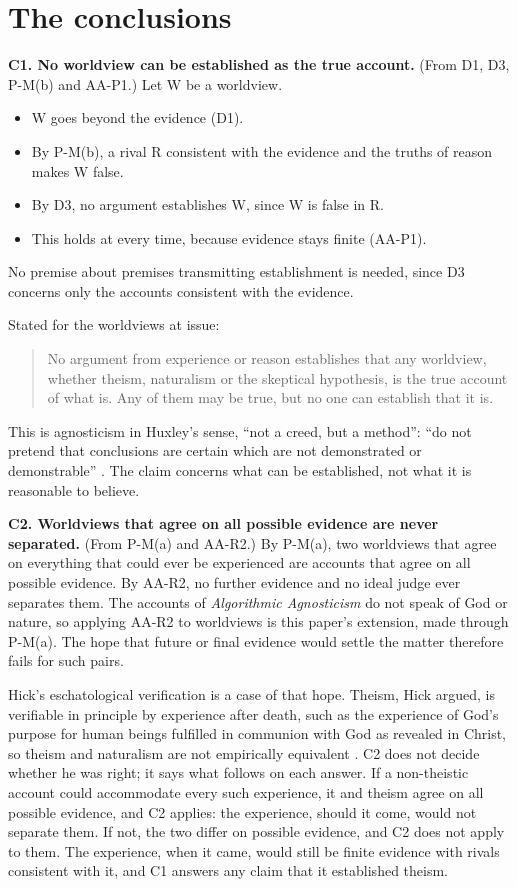 \section{The conclusions}\label{sec:result}

\noindent\textbf{C1. No worldview can be established as the true account.}\label{item:C1}
(From D1, D3, P-M(b) and AA-P1.)
Let W be a worldview.
\begin{itemize}
  \item W goes beyond the evidence (D1).
  \item By P-M(b), a rival R consistent with the evidence and the truths of reason makes W false.
  \item By D3, no argument establishes W, since W is false in R.
  \item This holds at every time, because evidence stays finite (AA-P1).
\end{itemize}
No premise about premises transmitting establishment is needed, since D3 concerns only the
accounts consistent with the evidence.

Stated for the worldviews at issue:

\begin{quote}
No argument from experience or reason establishes that any worldview, whether theism,
naturalism or the skeptical hypothesis, is the true account of what is. Any of them may be true,
but no one can establish that it is.
\end{quote}

This is agnosticism in Huxley's sense, ``not a creed, but a method'': ``do not pretend that
conclusions are certain which are not demonstrated or demonstrable''
\citep[pp.~245--246]{huxley1889}. The claim concerns what can be established, not what it is
reasonable to believe.

\medskip\noindent\textbf{C2. Worldviews that agree on all possible evidence are never
separated.}\label{item:C2}
(From P-M(a) and AA-R2.)
By P-M(a), two worldviews that agree on everything that could ever be experienced are accounts
that agree on all possible evidence. By AA-R2, no further evidence and no ideal judge ever
separates them. The accounts of \emph{Algorithmic Agnosticism} do not speak of God or nature, so applying AA-R2
to worldviews is this paper's extension, made through P-M(a). The hope that future or final
evidence would settle the matter therefore fails for such pairs.

Hick's eschatological verification is a case of that hope. Theism, Hick argued, is verifiable in
principle by experience after death, such as the experience of God's purpose for human beings
fulfilled in communion with God as revealed in Christ, so theism and naturalism are not empirically equivalent
\citep{hick1960}. C2 does not decide whether he was right; it says what follows on each answer. If a
non-theistic account could accommodate every such experience, it and theism agree on all possible
evidence, and C2 applies: the experience, should it come, would not separate them. If not, the two
differ on possible evidence, and C2 does not apply to them. The experience, when it came, would
still be finite evidence with rivals consistent with it, and C1 answers any claim that it
established theism.

